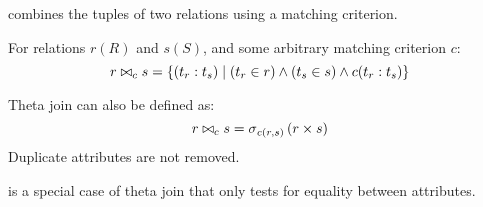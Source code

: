 \begin{multicols}{2}

    \begin{CheatsheetEntryFrame}


        \textit{} combines the tuples of two relations using a matching criterion.

        For relations $r(R)$ and $s(S)$, and some arbitrary matching criterion $c$:
        \begin{equation*}
            r \bowtie_c s = \setdef{(t_r : t_s)}{(t_r \in r) \wedge (t_s \in s) \wedge c(t_r : t_s)}
        \end{equation*}

        Theta join can also be defined as:
        \begin{equation*}
            r \bowtie_c s = \relselect_{c(r, s)}{\parens*{r \times s}}
        \end{equation*}
        Duplicate attributes are not removed.

        \vspace{\TextExtraSkip}%
        \textit{} is a special case of theta join that only tests for equality between attributes.


\end{CheatsheetEntryFrame}
\end{multicols}
